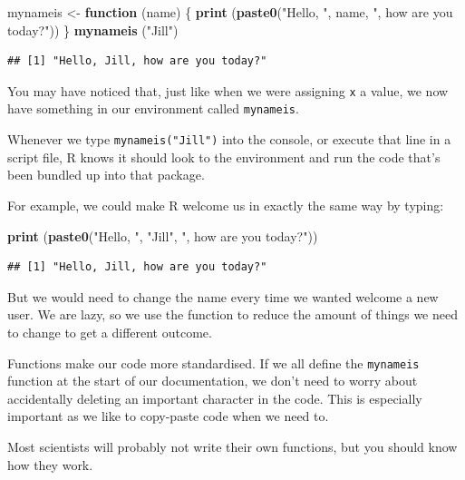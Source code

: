 \documentclass[
]{book}
\newenvironment{Shaded}{\begin{snugshade}}{\end{snugshade}}
\newcommand{\ControlFlowTok}[1]{\textcolor[rgb]{0.13,0.29,0.53}{\textbf{#1}}}
\newcommand{\KeywordTok}[1]{\textcolor[rgb]{0.13,0.29,0.53}{\textbf{#1}}}
\newcommand{\NormalTok}[1]{#1}
\newcommand{\StringTok}[1]{\textcolor[rgb]{0.31,0.60,0.02}{#1}}
\begin{document}
\begin{Shaded}
\begin{Highlighting}[]
\NormalTok{mynameis <-}\StringTok{ }\ControlFlowTok{function}\NormalTok{ (name) \{}
  \KeywordTok{print}\NormalTok{ (}\KeywordTok{paste0}\NormalTok{(}\StringTok{"Hello, "}\NormalTok{, name, }\StringTok{", how are you today?"}\NormalTok{))}
\NormalTok{\}}
\KeywordTok{mynameis}\NormalTok{ (}\StringTok{"Jill"}\NormalTok{)}
\end{Highlighting}
\end{Shaded}

\begin{verbatim}
## [1] "Hello, Jill, how are you today?"
\end{verbatim}

You may have noticed that, just like when we were assigning \texttt{x} a value, we now have something in our environment called \texttt{mynameis}.

Whenever we type \texttt{mynameis("Jill")} into the console, or execute that line in a script file, R knows it should look to the environment and run the code that's been bundled up into that package.

For example, we could make R welcome us in exactly the same way by typing:

\begin{Shaded}
\begin{Highlighting}[]
\KeywordTok{print}\NormalTok{ (}\KeywordTok{paste0}\NormalTok{(}\StringTok{"Hello, "}\NormalTok{, }\StringTok{"Jill"}\NormalTok{, }\StringTok{", how are you today?"}\NormalTok{))}
\end{Highlighting}
\end{Shaded}

\begin{verbatim}
## [1] "Hello, Jill, how are you today?"
\end{verbatim}

But we would need to change the name every time we wanted welcome a new user. We are lazy, so we use the function to reduce the amount of things we need to change to get a different outcome.

Functions make our code more standardised. If we all define the \texttt{mynameis} function at the start of our documentation, we don't need to worry about accidentally deleting an important character in the code. This is especially important as we like to copy-paste code when we need to.

Most scientists will probably not write their own functions, but you should know how they work.
\end{document}
